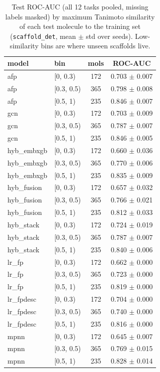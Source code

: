 \begin{table}[t]
\centering
\caption{Test ROC-AUC (all 12 tasks pooled, missing labels masked) by maximum Tanimoto similarity of each test molecule to the training set (\texttt{scaffold\_det}, mean $\pm$ std over seeds). Low-similarity bins are where unseen scaffolds live.}
\label{tab:hybrid-simbins}
\small
\begin{tabular}{llcc}
\toprule
model & bin & mols & ROC-AUC \\
\midrule
afp & [0, 0.3) & 172 & 0.703 $\pm$ 0.007 \\
afp & [0.3, 0.5) & 365 & 0.798 $\pm$ 0.008 \\
afp & [0.5, 1) & 235 & 0.846 $\pm$ 0.007 \\
gcn & [0, 0.3) & 172 & 0.703 $\pm$ 0.009 \\
gcn & [0.3, 0.5) & 365 & 0.787 $\pm$ 0.007 \\
gcn & [0.5, 1) & 235 & 0.846 $\pm$ 0.005 \\
hyb\_embxgb & [0, 0.3) & 172 & 0.660 $\pm$ 0.036 \\
hyb\_embxgb & [0.3, 0.5) & 365 & 0.770 $\pm$ 0.006 \\
hyb\_embxgb & [0.5, 1) & 235 & 0.835 $\pm$ 0.009 \\
hyb\_fusion & [0, 0.3) & 172 & 0.657 $\pm$ 0.032 \\
hyb\_fusion & [0.3, 0.5) & 365 & 0.766 $\pm$ 0.021 \\
hyb\_fusion & [0.5, 1) & 235 & 0.812 $\pm$ 0.033 \\
hyb\_stack & [0, 0.3) & 172 & 0.724 $\pm$ 0.019 \\
hyb\_stack & [0.3, 0.5) & 365 & 0.787 $\pm$ 0.007 \\
hyb\_stack & [0.5, 1) & 235 & 0.840 $\pm$ 0.006 \\
lr\_fp & [0, 0.3) & 172 & 0.662 $\pm$ 0.000 \\
lr\_fp & [0.3, 0.5) & 365 & 0.723 $\pm$ 0.000 \\
lr\_fp & [0.5, 1) & 235 & 0.819 $\pm$ 0.000 \\
lr\_fpdesc & [0, 0.3) & 172 & 0.704 $\pm$ 0.000 \\
lr\_fpdesc & [0.3, 0.5) & 365 & 0.740 $\pm$ 0.000 \\
lr\_fpdesc & [0.5, 1) & 235 & 0.816 $\pm$ 0.000 \\
mpnn & [0, 0.3) & 172 & 0.645 $\pm$ 0.007 \\
mpnn & [0.3, 0.5) & 365 & 0.769 $\pm$ 0.015 \\
mpnn & [0.5, 1) & 235 & 0.828 $\pm$ 0.014 \\

\end{tabular}
\end{table}
